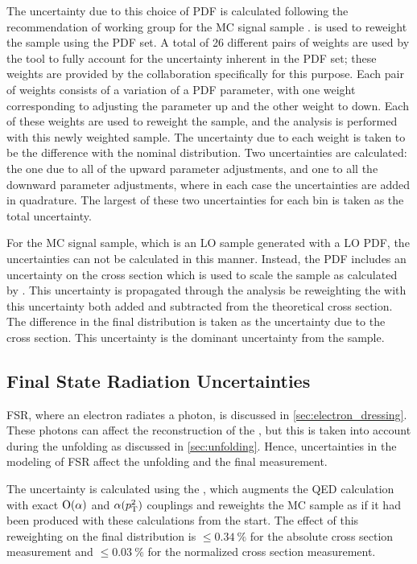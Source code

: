 The uncertainty due to this choice of PDF is calculated following the
recommendation of \PDFforLHC working group for the \POWHEG MC signal sample
\cite{botje_2011}. \PDFWeightProducer is used to reweight the \POWHEG sample
using the \CTten PDF set. A total of \num{26} different pairs of weights are
used by the tool to fully account for the uncertainty inherent in the PDF set;
these weights are provided by the \CTten collaboration specifically for this
purpose. Each pair of weights consists of a variation of a PDF parameter, with
one weight corresponding to adjusting the parameter up and the other weight to
down. Each of these weights are used to reweight the \POWHEG sample, and the
analysis is performed with this newly weighted sample. The uncertainty due to
each weight is taken to be the difference with the nominal \phistar
distribution. Two uncertainties are calculated: the one due to all of the
upward parameter adjustments, and one to all the downward parameter
adjustments, where in each case the uncertainties are added in quadrature. The
largest of these two uncertainties for each \phistar bin is taken as the total
uncertainty.

For the \MADGRAPH MC signal sample, which is an LO sample generated with a LO
PDF, the uncertainties can not be calculated in this manner. Instead, the PDF
includes an uncertainty on the cross section which is used to scale the sample
as calculated by \FEWZ. This uncertainty is propagated through the analysis be
reweighting the \MADGRAPH with this uncertainty both added and subtracted from
the theoretical cross section. The difference in the final \phistar
distribution is taken as the uncertainty due to the \FEWZ cross section. This
uncertainty is the dominant uncertainty from the \MADGRAPH sample.

\subsection{Final State Radiation Uncertainties}
\label{ssec:fsr_uncertainties}

FSR, where an electron radiates a photon, is discussed in
\cref{sec:electron_dressing}. These photons can affect the reconstruction
of the \Z, but this is taken into account during the unfolding as discussed in
\cref{sec:unfolding}. Hence, uncertainties in the modeling of FSR affect
the unfolding and the final measurement.

The uncertainty is calculated using the \FSRWeightProducer, which augments the
\PYTHIA QED calculation with exact $\operatorname{O}\!\left( \alpha \right)$ and $\alpha(p_{\mathrm{T}}^{2})$
couplings and reweights the MC sample as if it had been produced with these
calculations from the start. The effect of this reweighting on the final
\phistar distribution is $\le \SI{0.34}{\percent}$ for the absolute cross
section measurement and $\le \SI{0.03}{\percent}$ for the normalized cross
section measurement.

